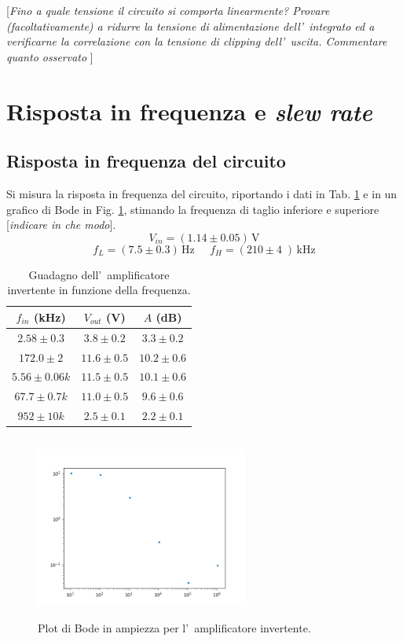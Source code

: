 \documentclass[10pt,a4paper]{article}
\newcommand{\rem}[1]{[\emph{#1}]}
\begin{document}
\rem{Fino a quale tensione il circuito si comporta linearmente? Provare (facoltativamente) a ridurre la 
tensione di alimentazione dell'~integrato ed a verificarne la correlazione con la tensione di 
\emph{clipping} dell'~uscita. Commentare quanto osservato }

%
\section{Risposta in frequenza e \emph{slew rate}}
\subsection{Risposta in frequenza del circuito}
Si misura la risposta in frequenza del circuito, riportando i dati  in Tab. \ref{tab:bodeinv} e
in un grafico di Bode in Fig. \ref{fig:bodeinv}, stimando la frequenza di taglio inferiore e 
superiore \rem{indicare in che modo}.
\[
V_{in} = (1.14 \pm 0.05 )\,\mathrm{V}
\]
\[
f_L = (7.5 \pm 0.3 )\,\mathrm{Hz}\;\;\;\;\;f_H = (210 \pm 4 \;)\,\mathrm{kHz}
\]
\begin{table}[h]
\caption{\small Guadagno dell'~amplificatore invertente in funzione della frequenza.}
\label{tab:bodeinv}
\begin{center}
\begin{tabular}{|c|c|c|}
\hline
$f_{in}$ (kHz) & $V_{out}$ (V) & $A$ (dB) \\
\hline
$2.58 \pm 0.3$& $ 3.8 \pm 0.2$& $3.3\pm 0.2$ \\ 
\hline
$172.0 \pm 2$& $ 11.6 \pm 0.5$& $10.2\pm 0.6$ \\
\hline
$5.56 \pm 0.06 k$& $ 11.5 \pm 0.5$& $10.1\pm 0.6$ \\ 
\hline
$67.7 \pm 0.7 k$& $ 11.0 \pm 0.5$& $9.6\pm 0.6$ \\ 
\hline
$952 \pm 10 k$& $ 2.5 \pm 0.1$& $2.2\pm 0.1$ \\ 
\hline
\end{tabular}
\end{center}
\end{table} 




 


\begin{figure}[h]
\begin{center}
\includegraphics[width=7cm,height=6cm]{3a.png}
\caption{\small Plot di Bode in ampiezza per l'~amplificatore invertente.}
\label{fig:bodeinv}
\end{center}
\end{figure}
%
\end{document}
